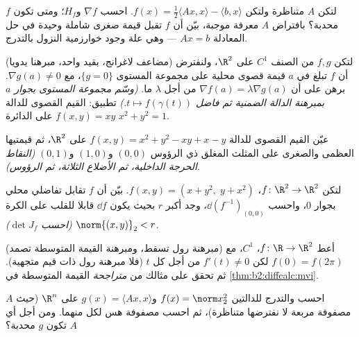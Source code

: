 \begin{exercise}[$\star\star$]\label{exo:b2:diffcalc:5}
لتكن $A$ متناظرة ولتكن $f(x) = \frac12\langle Ax, x\rangle -
\langle b, x\rangle$. احسب $\nabla f$ و$H_f$؛ ومتى تكون
$f$ محدبة؟ بافتراض $A$ معرفة موجبة، بيّن أن $f$ تقبل قيمة
صغرى شاملة وحيدة في حل المعادلة $Ax = b$ --- وهي علة وجود خوارزمية
النزول بالتدرج.
\end{exercise}

\begin{exercise}[$\star\star$]\label{exo:b2:diffcalc:6}
(مضاعف لاغرانج، بقيد واحد، مبرهنا يدويا) لتكن $f, g$ من الصنف
$C^1$ على $\R^2$، ولنفترض أن $f$ تبلغ في $a$ قيمة قصوى محلية
على مجموعة المستوى $\{g = 0\}$، مع $\nabla g(a) \neq 0$. برهن على أن $\nabla f(a) = \lambda\nabla g(a)$ من أجل
$\lambda$ ما.
\emph{(وسّم مجموعة المستوى بجوار $a$ بمبرهنة الدالة الضمنية ثم
فاضل $t \mapsto f(\gamma(t))$.)} تطبيق: القيم القصوى للدالة $f(x,y) = xy$ على الدائرة
$x^2 + y^2 = 1$.
\end{exercise}

\begin{exercise}[$\star\star$]\label{exo:b2:diffcalc:7}
عيّن القيم القصوى للدالة $f(x, y) = x^2 + y^2 - xy + x - y$ على $\R^2$، ثم قيمتيها العظمى
والصغرى على المثلث المغلق ذي الرؤوس $(0,0)$ و$(1,0)$ و$(0,1)$
\emph{(النقاط الحرجة الداخلية، ثم الأضلاع الثلاثة، ثم الرؤوس)}.
\end{exercise}

\begin{exercise}[$\star\star\star$]\label{exo:b2:diffcalc:8}
لتكن $f \colon \R^2 \to \R^2$، $f(x, y) = (x + y^2,\; y + x^2)$.
بيّن أن $f$ تقابل تفاضلي محلي بجوار $0$، واحسب $\dd(f^{-1})_{(0,0)}$، وجد
أكبر $r$ بحيث يكون $\dd f$ قابلا للقلب على الكرة $\norm{(x,y)}_2 < r$
\emph{(احسب $\det J_f$)}.
\end{exercise}

\begin{exercise}[$\star\star\star$]\label{exo:b2:diffcalc:9}
(مبرهنة رول تسقط، ومبرهنة القيمة المتوسطة تصمد) أعط $f \colon \R \to \R^2$، $C^1$،
مع $f(0) = f(2\pi)$ لكن $f'(t) \neq 0$ من أجل كل $t$ (فلا مبرهنة رول ذات قيم
متجهية). ثم تحقق على مثالك من \emph{متراجحة} القيمة المتوسطة في
\cref{thm:b2:diffcalc:mvi}.
\end{exercise}

\begin{exercise}[$\star$]\label{exo:b2:diffcalc:10}
احسب  والتدرج للدالتين $f(x) = \norm
x_2^2$ و$g(x) = \langle Ax, x\rangle$ على $\R^n$ (حيث $A$
مصفوفة مربعة لا نفترضها متناظرة)، ثم احسب مصفوفة هس لكل منهما.
ومن أجل أي $A$ تكون $g$ محدبة؟
\end{exercise}

